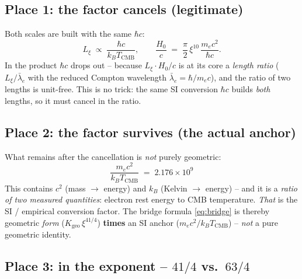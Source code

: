 \subsection*{Place 1: the factor cancels (legitimate)}

Both scales are built with the same $\hbar c$:
\begin{equation}
  L_\xi \;\propto\; \frac{\hbar c}{k_B T_\text{CMB}},
  \qquad
  \frac{H_0}{c} \;=\; \frac{\pi}{2}\,\xi^{10}\,\frac{m_e c^2}{\hbar c}.
\end{equation}
In the product $\hbar c$ drops out -- because $L_\xi\cdot H_0/c$ is at its core
a \emph{length ratio} ($L_\xi/\bar\lambda_e$ with the reduced Compton wavelength
$\bar\lambda_e=\hbar/m_ec$), and the ratio of two lengths is unit-free. This is
no trick: the same SI conversion $\hbar c$ builds \emph{both} lengths, so it
must cancel in the ratio.

\subsection*{Place 2: the factor survives (the actual anchor)}

What remains after the cancellation is \emph{not} purely geometric:
\begin{equation}
  \boxed{\;\frac{m_e c^2}{k_B T_\text{CMB}} \;=\; 2.176\times10^{9}\;}
\end{equation}
This contains $c^2$ (mass $\to$ energy) and $k_B$ (Kelvin $\to$ energy) -- and
it is a \emph{ratio of two measured quantities}: electron rest energy to CMB
temperature. \emph{That} is the SI / empirical conversion factor. The bridge
formula \eqref{eq:bridge} is thereby geometric \emph{form}
($K_\text{geo}\,\xi^{41/4}$) \textbf{times} an SI anchor
($m_e c^2/k_B T_\text{CMB}$) -- \emph{not} a pure geometric identity.

\subsection*{Place 3: in the exponent -- $41/4$ vs.\ $63/4$}

